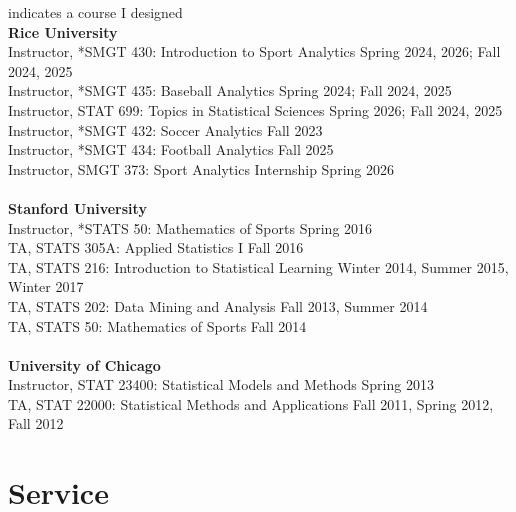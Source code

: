 \documentclass{article}
\begin{document}
\vspace{-4mm}\hfill * indicates a course I designed\\
{\bf Rice University}\\
Instructor, *SMGT 430: Introduction to Sport Analytics \hfill Spring 2024, 2026; Fall 2024, 2025\\
Instructor, *SMGT 435: Baseball Analytics \hfill Spring 2024; Fall 2024, 2025\\
Instructor, STAT 699: Topics in Statistical Sciences \hfill Spring 2026; Fall 2024, 2025\\
Instructor, *SMGT 432: Soccer Analytics \hfill Fall 2023\\
Instructor, *SMGT 434: Football Analytics \hfill Fall 2025\\
Instructor, SMGT 373: Sport Analytics Internship \hfill Spring 2026\\
~\\
{\bf Stanford University}\\
Instructor, *STATS 50: Mathematics of Sports \hspace{5mm} \hfill Spring 2016\\
TA, STATS 305A: Applied Statistics I \hfill Fall 2016\\
TA, STATS 216: Introduction to Statistical Learning \hfill Winter 2014, Summer 2015, Winter 2017\\
TA, STATS 202: Data Mining and Analysis \hfill Fall 2013, Summer 2014\\
TA, STATS 50: Mathematics of Sports \hfill Fall 2014\\
~\\
{\bf University of Chicago}\\
Instructor, STAT 23400: Statistical Models and Methods \hfill Spring 2013\\
TA, STAT 22000: Statistical Methods and Applications \hfill Fall 2011, Spring 2012, Fall 2012


\section*{\sc Service}
\end{document}
